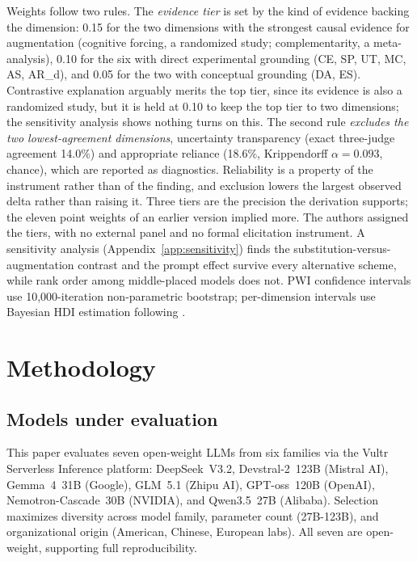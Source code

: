 \documentclass{article}
\begin{document}
Weights follow two rules. The \textit{evidence tier} is set by the kind of evidence backing the dimension: 0.15 for the two dimensions with the strongest causal evidence for augmentation (cognitive forcing, a randomized study; complementarity, a meta-analysis), 0.10 for the six with direct experimental grounding (CE, SP, UT, MC, AS, AR\_d), and 0.05 for the two with conceptual grounding (DA, ES). Contrastive explanation arguably merits the top tier, since its evidence is also a randomized study, but it is held at 0.10 to keep the top tier to two dimensions; the sensitivity analysis shows nothing turns on this. The second rule \textit{excludes the two lowest-agreement dimensions}, uncertainty transparency (exact three-judge agreement 14.0\%) and appropriate reliance (18.6\%, Krippendorff $\alpha = 0.093$, chance), which are reported as diagnostics. Reliability is a property of the instrument rather than of the finding, and exclusion lowers the largest observed delta rather than raising it. Three tiers are the precision the derivation supports; the eleven point weights of an earlier version implied more. The authors assigned the tiers, with no external panel and no formal elicitation instrument. A sensitivity analysis (Appendix~\ref{app:sensitivity}) finds the substitution-versus-augmentation contrast and the prompt effect survive every alternative scheme, while rank order among middle-placed models does not. PWI confidence intervals use 10{,}000-iteration non-parametric bootstrap; per-dimension intervals use Bayesian HDI estimation following \cite{bowyer2025clt}.


\section{Methodology}
\label{sec:methodology}

\subsection{Models under evaluation}

This paper evaluates seven open-weight LLMs from six families via the Vultr Serverless Inference platform: DeepSeek~V3.2, Devstral-2~123B (Mistral AI), Gemma~4~31B (Google), GLM~5.1 (Zhipu AI), GPT-oss~120B (OpenAI), Nemotron-Cascade~30B (NVIDIA), and Qwen3.5~27B (Alibaba). Selection maximizes diversity across model family, parameter count (27B-123B), and organizational origin (American, Chinese, European labs). All seven are open-weight, supporting full reproducibility.
\end{document}
